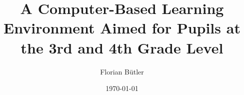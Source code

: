 \documentclass[a4paper, oneside]{thesis}
\title{A Computer-Based Learning Environment Aimed for Pupils at the 3rd and 4th Grade Level}
\author{Florian Bütler}
\institute{Chair of Information Technology and Education \\[2pt]
ETH Zürich}
\date{\today}
\begin{document}
\frontmatter %
\maketitle

\cleardoublepage

\begin{abstract}
	
\end{abstract}

\begin{acknowledgements}
	
\end{acknowledgements}

\tableofcontents

\mainmatter %














% 
\end{document}
